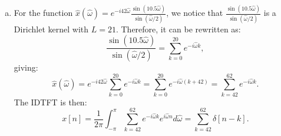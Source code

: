 \begin{enumerate}
\begin{enumerate}[a)]
\item For the function $\hat{x}(\hat{\omega})=e^{-i42\hat{\omega}}\frac{\sin(10.5\hat{\omega})}{\sin(\hat{\omega}/2)}$, we notice that $\frac{\sin(10.5\hat{\omega})}{\sin(\hat{\omega}/2)}$ is a Dirichlet kernel with $L=21$. Therefore, it can be rewritten as:
$$\frac{\sin(10.5\hat{\omega})}{\sin(\hat{\omega}/2)}=\sum_{k=0}^{20}e^{-i\hat{\omega}k},$$
giving:
$$\hat{x}(\hat{\omega})=e^{-i42\hat{\omega}}\sum_{k=0}^{20}e^{-i\hat{\omega}k}=\sum_{k=0}^{20}e^{-i\hat{\omega}(k+42)}=\sum_{k=42}^{62}e^{-i\hat{\omega}k}.$$
The IDTFT is then:
$$x[n]=\frac{1}{2\pi}\int_{-\pi}^{\pi}\sum_{k=42}^{62}e^{-i\hat{\omega}k}e^{i\hat{\omega}n}d\hat{\omega} =\sum_{k=42}^{62}\delta[n-k].$$
\end{enumerate}









\end{enumerate}